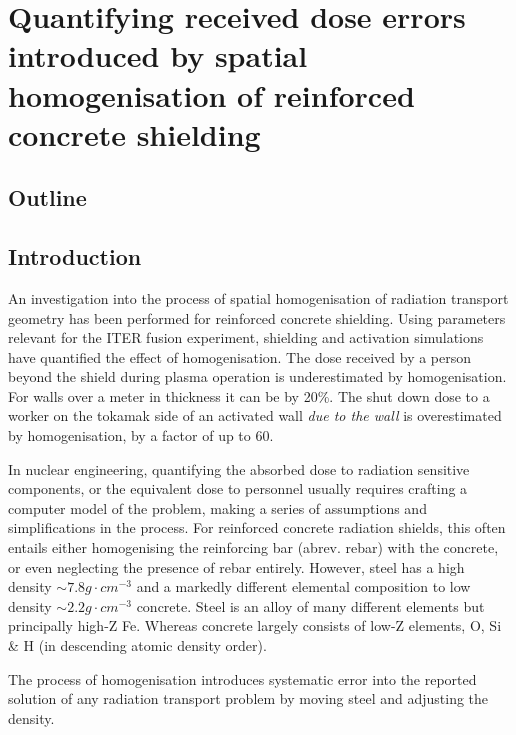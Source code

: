 
\chapter{Quantifying received dose errors introduced by spatial homogenisation of reinforced concrete shielding}
\label{chap:homogenisation}

\ifpdf
    \graphicspath{{Chapter2/Figs/Raster/}{Chapter2/Figs/PDF/}{Chapter2/Figs/}}
\else
    \graphicspath{{Chapter2/Figs/Vector/}{Chapter2/Figs/}}
\fi


\section{Outline}

\section{Introduction}
An investigation into the process of spatial homogenisation of radiation transport geometry has been performed for reinforced concrete shielding. Using parameters relevant for the ITER fusion experiment, shielding and activation simulations have quantified the effect of homogenisation. The dose received by a person beyond the shield during plasma operation is underestimated by homogenisation. For walls over a meter in thickness it can be by 20\%. The shut down dose to a worker on the tokamak side of an activated wall \textit{due to the wall} is overestimated by homogenisation, by a factor of up to 60.

In nuclear engineering, quantifying the absorbed dose to radiation sensitive components, or the equivalent dose to personnel usually requires crafting a computer model of the problem, making a series of assumptions and simplifications in the process. For reinforced concrete radiation shields, this often entails either homogenising the reinforcing bar (abrev. rebar) with the concrete, or even neglecting the presence of rebar entirely. However, steel has a high density $\sim7.8g\cdot cm^{-3}$ and a markedly different elemental composition to low density $\sim2.2g\cdot cm^{-3}$ concrete. Steel is an alloy of many different elements but principally high-Z Fe. Whereas concrete largely consists of low-Z elements, O, Si \& H (in descending atomic density order).\par
The process of homogenisation introduces systematic error into the reported solution of any radiation transport problem by moving steel and adjusting the density.

